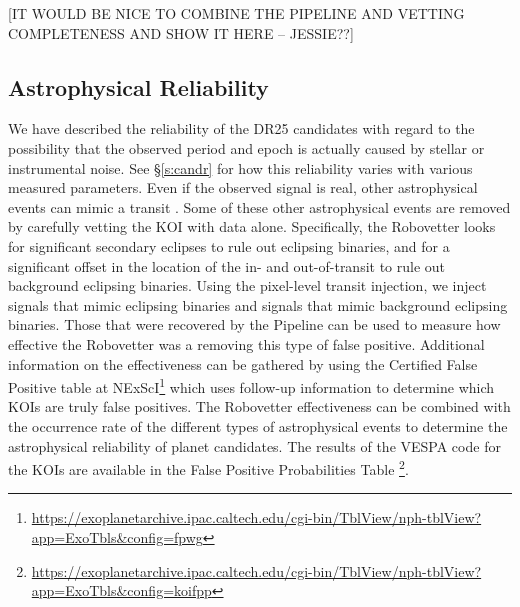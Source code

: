 [IT WOULD BE NICE TO COMBINE THE PIPELINE AND VETTING COMPLETENESS AND SHOW IT HERE -- JESSIE??]

\subsection{Astrophysical Reliability}
We have described the reliability of the DR25 candidates with regard to the possibility that the observed period and epoch is actually caused by stellar or instrumental noise. See \S\ref{s:candr} for how this reliability varies with various measured parameters.  Even if the observed signal is real, other astrophysical events can mimic a transit \citep{Morton2016}. Some of these other astrophysical events are removed by carefully vetting the KOI with \Kepler{} data alone.  Specifically, the Robovetter looks for significant secondary eclipses to rule out eclipsing binaries, and for a significant offset in the location of the in- and out-of-transit to rule out background eclipsing binaries.  Using the pixel-level transit injection, we inject signals that mimic eclipsing binaries and signals that mimic background eclipsing binaries. Those that were recovered by the \Kepler{} Pipeline can be used to measure how effective the Robovetter was a removing this type of false positive. Additional information on the effectiveness can be gathered by using the Certified False Positive table at NExScI\footnote{\url{https://exoplanetarchive.ipac.caltech.edu/cgi-bin/TblView/nph-tblView?app=ExoTbls\&config=fpwg}} which uses follow-up information to determine which KOIs are truly false positives. The Robovetter effectiveness can be combined with the occurrence rate of the different types of astrophysical events to determine the astrophysical reliability of planet candidates. The results of the VESPA code \citep[][]{Morton2016} for the KOIs are available in the False Positive Probabilities Table \footnote{\url{https://exoplanetarchive.ipac.caltech.edu/cgi-bin/TblView/nph-tblView?app=ExoTbls\&config=koifpp}}.

